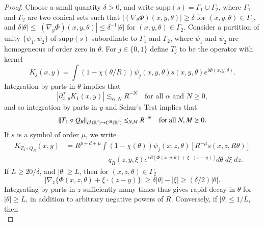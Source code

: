 \begin{proof}
  Choose a small quantity $\delta > 0$, and write $\text{supp}(s) = \Gamma_1 \cup \Gamma_2$, where $\Gamma_1$ and $\Gamma_2$ are two conical sets such that $|(\nabla_\theta \Phi)(x,y,\theta)| \geq \delta$ for $(x,y,\theta) \in \Gamma_1$, and $\delta |\theta| \leq |(\nabla_y \Phi)(x,y,\theta)| \leq \delta^{-1} |\theta|$ for $(x,y,\theta) \in \Gamma_2$. Consider a partition of unity $\{ \psi_1, \psi_2 \}$ of $\text{supp}(s)$ subordinate to $\Gamma_1$ and $\Gamma_2$, where $\psi_1$ and $\psi_2$ are homogeneous of order zero in $\theta$. For $j \in \{0,1 \}$ define $T_j$ to be the operator with kernel
  \begin{equation}
    K_j(x,y) = \int (1 - \chi(\theta / R)) \psi_j(x,y,\theta) s(x,y,\theta) e^{i \Phi(x,y,\theta)}.
  \end{equation}
  Integration by parts in $\theta$ implies that
  \begin{equation}
    |\partial_{x,y}^\alpha K_1(x,y)| \lesssim_{\alpha,N} R^{-N} \quad\text{for all $\alpha$ and $N \geq 0$}, 
  \end{equation}
  and so integration by parts in $y$ and Schur's Test implies that
  \begin{equation} \label{quiowjdqoidj1312}
    \| T_1 \circ Q_R \|_{L^1(\operatorname{\mathbb{R}}^d) \to C^M(\operatorname{\mathbb{R}}^d)} \lesssim_{N,M} R^{-N} \quad\text{for all $N,M \geq 0$}.
  \end{equation}
  If $s$ is a symbol of order $\mu$, we write
  \begin{equation}
  \begin{split}
    K_{T_2 \circ Q_R}(x,y) & = R^{p + d + \mu} \int (1 - \chi(\theta)) \psi_j(x,z,\theta) [ R^{-\mu} s(x,z,R\theta) ]\\
    &\quad\quad\quad\quad\quad\quad   q_R(z,y,\xi) e^{i R[\Phi(x,y,\theta) + \xi \cdot (x - y)]} d\theta\; d\xi\; dz.
  \end{split}
  \end{equation}
  If $L \geq 20 / \delta$, and $|\theta| \geq L$, then for $(x,z,\theta) \in \Gamma_2$
  \begin{equation}
    |\nabla_z \{ \Phi(x,z,\theta) + \xi \cdot (z - y) \}| \geq \delta |\theta| - |\xi| \geq (\delta/2) |\theta|.
  \end{equation}
  Integrating by parts in $z$ sufficiently many times thus gives rapid decay in $\theta$ for $|\theta| \geq L$, in addition to arbitrary negative powers of $R$. Conversely, if $|\theta| \leq 1/L$, then 
  \begin{equation}

\end{equation}
\end{proof}
